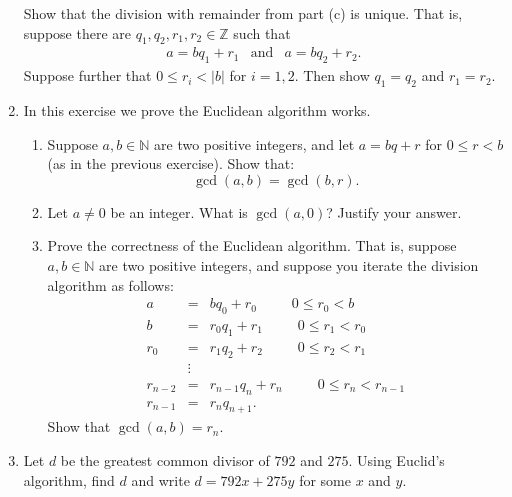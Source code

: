 \documentclass[11pt]{article}
\newcommand{\bN}{\mathbb{N}}
\newcommand{\bZ}{\mathbb{Z}}
\begin{document}
\begin{enumerate}
{\begin{enumerate}
{  Show that the division with remainder from part (c) is unique.  That is, suppose there are $q_1,q_2,r_1,r_2\in\bZ$ such that
  \begin{eqnarray*}
    a = bq_1+r_1 &\text{and}&a= bq_2+r_2.
  \end{eqnarray*}
  Suppose further that $0\le r_i< |b|$ for $i=1,2$.  Then show $q_1=q_2$ and $r_1=r_2$.
  }
\end{enumerate}
}
\item{
In this exercise we prove the Euclidean algorithm works.
\begin{enumerate}
  \item{
  Suppose $a,b\in\bN$ are two positive integers, and let $a=bq+r$ for $0\le r<b$ (as in the previous exercise).  Show that:
  \[\gcd(a,b) = \gcd(b,r).\]
  }
  \item{
  Let $a\not=0$ be an integer.  What is $\gcd(a,0)$?  Justify your answer.
  }
  \item{
  Prove the correctness of the Euclidean algorithm.  That is, suppose $a,b\in\bN$ are two positive integers, and suppose you iterate the division algorithm as follows:
  \begin{eqnarray*}
    a &=& bq_0 + r_0\hspace{30pt}0\le r_0<b\\
    b &=& r_0q_1 + r_1\hspace{30pt}0\le r_1<r_0\\
    r_0&=& r_1q_2 + r_2\hspace{30pt}0\le r_2<r_1\\
    &\vdots&\\
    r_{n-2}&=& r_{n-1}q_n + r_n \hspace{30pt}0\le r_n<r_{n-1}\\
    r_{n-1} &=& r_nq_{n+1}.
  \end{eqnarray*}
  Show that $\gcd(a,b) = r_n$.
  }
\end{enumerate}
}
\item Let $d$ be the greatest common divisor of $792$ and $275$.  Using Euclid's algorithm, find $d$ and write $d=792x + 275y$ for some $x$ and $y$.
\end{enumerate}
\end{document}
